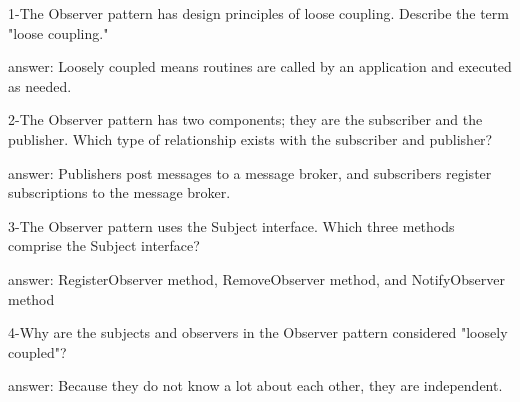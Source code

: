 1-The Observer pattern has design principles of loose coupling. Describe the term "loose coupling."

answer: Loosely coupled means routines are called by an application and executed as needed.

2-The Observer pattern has two components; they are the subscriber and the publisher. Which type of relationship exists with the subscriber and publisher?

answer: Publishers post messages to a message broker, and subscribers register subscriptions to the message broker.

3-The Observer pattern uses the Subject interface. Which three methods comprise the Subject interface?

answer: RegisterObserver method, RemoveObserver method, and NotifyObserver method

4-Why are the subjects and observers in the Observer pattern considered "loosely coupled"?

answer: Because they do not know a lot about each other, they are independent.
